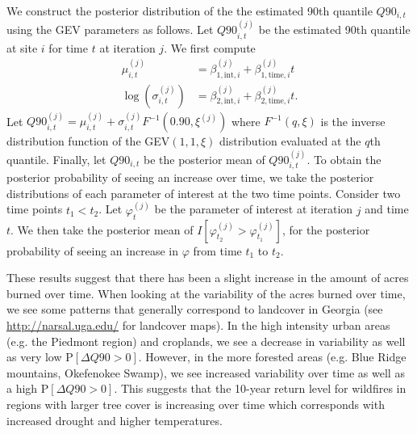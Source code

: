 We construct the posterior distribution of the the estimated 90th quantile $Q90_{i, t}$ using the GEV parameters as follows.
Let $Q90_{i, t}^{(j)}$ be the estimated 90th quantile at site $i$ for time $t$ at iteration $j$.
We first compute
\begin{align}
  \mu_{i, t}^{(j)} &= \beta_{1, \text{int}, i}^{(j)} + \beta_{1, \text{time}, i}^{(j)} t \\
  \log\left(\sigma_{i, t}^{(j)}\right) &= \beta_{2, \text{int}, i}^{(j)} + \beta_{2, \text{time}, i}^{(j)} t. \nonumber
\end{align}
Let $Q90_{i, t}^{(j)} = \mu_{i, t}^{(j)} + \sigma_{i, t}^{(j)} F^{-1}\left(0.90, \xi^{(j)}\right)$ where $F^{-1}(q, \xi)$ is the inverse distribution function of the GEV$(1, 1, \xi)$ distribution evaluated at the $q$th quantile.
Finally, let $Q90_{i, t}$ be the posterior mean of $Q90_{i, t}^{(j)}$.
To obtain the posterior probability of seeing an increase over time, we take the posterior distributions of each parameter of interest at the two time points.
Consider two time points $t_1 < t_2$.
Let $\varphi_t^{(j)}$ be the parameter of interest at iteration $j$ and time $t$.
We then take the posterior mean of $I\left[\varphi_{t_2}^{(j)} > \varphi_{t_1}^{(j)}\right]$, for the posterior probability of seeing an increase in $\varphi$ from time $t_1$ to $t_2$.

These results suggest that there has been a slight increase in the amount of acres burned over time.
When looking at the variability of the acres burned over time, we see some patterns that generally correspond to landcover in Georgia (see \url{http://narsal.uga.edu/} for landcover maps).
In the high intensity urban areas (e.g. the Piedmont region) and croplands, we see a decrease in variability as well as very low P$[\Delta Q90 > 0]$.
However, in the more forested areas (e.g. Blue Ridge mountains, Okefenokee Swamp), we see increased variability over time as well as a high P$[\Delta Q90 > 0]$.
This suggests that the 10-year return level for wildfires in regions with larger tree cover is increasing over time which corresponds with increased drought and higher temperatures.

